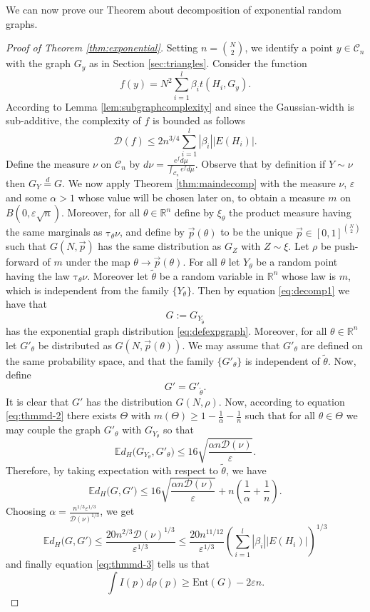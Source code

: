 \documentclass[12pt]{article}
\def \tilt{ \mathrm{\tau} }
\def \RR {\mathbb R}
\def \EE {\mathbb E}
\def \eps {\varepsilon}
\def \DC {\mathcal{C}_n}
\def \Ent {\mathrm{Ent}}
\def \Comp { \mathcal{D} }
\theoremstyle{definition}
\theoremstyle{remark}
\begin{document}
We can now prove our Theorem about decomposition of exponential random graphs.
\begin{proof}[Proof of Theorem \ref{thm:exponential}]
Setting $n = {N \choose 2}$, we identify a point $y \in \DC$ with the graph $G_y$ as in Section \ref{sec:triangles}. Consider the function
$$
f(y) = N^2 \sum_{i=1}^l \beta_i t(H_i,G_y).
$$
According to Lemma \ref{lem:subgraphcomplexity} and since the Gaussian-width is sub-additive, the complexity of $f$ is bounded as follows
$$
\Comp(f) \leq 2 n^{3/4} \sum_{i=1}^l |\beta_i| |E(H_i)|.
$$
Define the measure $\nu$ on $\DC$ by $d \nu = \frac{e^{f} d \mu}{\int_{\DC} e^f d \mu}$. Observe that by definition if $Y \sim \nu$ then $G_Y \stackrel{d}{=} G$.
We now apply Theorem \ref{thm:maindecomp} with the measure $\nu$, $\eps$ and some $\alpha > 1$ whose value will be chosen later on, to obtain a measure $m$ on $B(0, \eps \sqrt{n})$. Moreover, for all $\theta \in \RR^n$ define by $\xi_\theta$ the product measure having the same marginals as $\tilt_\theta \nu$, and define by $\vec p(\theta)$ to be the unique $\vec p \in [0,1]^{ {N \choose 2} }$ such that $G(N,\vec p)$ has the same distribution as $G_Z$ with $Z \sim \xi$. Let $\rho$ be push-forward of $m$ under the map $\theta \to \vec p(\theta)$. For all $\theta$ let $Y_\theta$ be a random point having the law $\tilt_\theta \nu$. Moreover let $\tilde \theta$ be a random variable in $\RR^n$ whose law is $m$, which is independent from the family $\{Y_\theta\}$. Then by equation \eqref{eq:decomp1} we have that
$$
G := G_{Y_{\tilde \theta}}
$$
has the exponential graph distribution \eqref{eq:defexpgraph}. Moreover, for all $\theta \in \RR^n$ let $G'_\theta$ be distributed as $G(N, \vec p(\theta))$. We may assume that $G'_\theta$ are defined on the same probability space, and that the family $\{G'_\theta\}$ is independent of $\tilde \theta$. Now, define
$$
G' = G'_{\tilde \theta}.
$$
It is clear that $G'$ has the distribution $G(N,\rho)$. Now, according to equation \eqref{eq:thmmd-2} there exists $\Theta$ with $m(\Theta) \geq 1 - \frac{1}{\alpha} - \frac{1}{n}$ such that for all $\theta \in \Theta$ we may couple the graph $G'_\theta$ with $G_{Y_\theta}$ so that
$$
\EE d_H\bigl (G_{Y_\theta}, G'_\theta \bigr ) \leq 16 \sqrt{\frac{\alpha n \Comp(\nu)}{\eps}}.
$$
Therefore, by taking expectation with respect to $\tilde \theta$, we have
$$
\EE d_H\bigl (G, G' \bigr ) \leq 16 \sqrt{\frac{\alpha n \Comp(\nu)}{\eps}} + n  \left (\frac{1}{\alpha} + \frac{1}{n} \right ).
$$
Choosing $\alpha = \frac{n^{1/3} \eps^{1/3}}{\Comp(\nu)^{1/3}}$, we get
$$
\EE d_H\bigl (G, G' \bigr ) \leq \frac{20 n^{2/3} \Comp(\nu)^{1/3}}{\eps^{1/3}} \leq \frac{20 n^{11/12} }{\eps^{1/3}} \left (\sum_{i=1}^l |\beta_i| |E(H_i)|\right )^{1/3}
$$
and finally equation \eqref{eq:thmmd-3} tells us that
$$
\int I(p) d \rho(p) \geq \Ent(G) - 2 \eps n.
$$

\end{proof}
\end{document}
